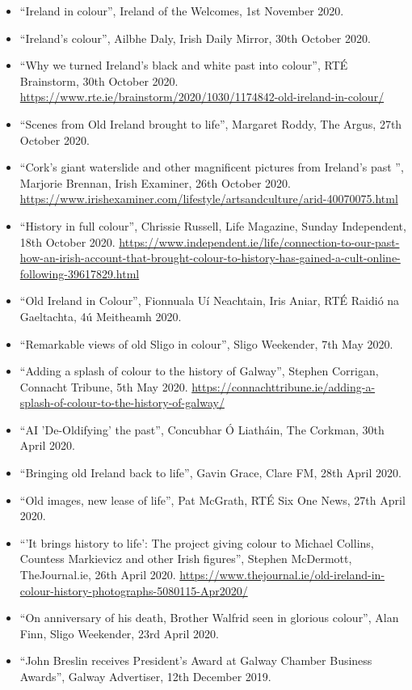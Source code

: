 \documentclass[10pt,a4paper]{res} %
\begin{document}
\begin{resume}
{\begin{itemize}
\item ``Ireland in colour'', Ireland of the Welcomes, 1st November 2020.
\item ``Ireland's colour'', Ailbhe Daly, Irish Daily Mirror, 30th October 2020.
\item ``Why we turned Ireland's black and white past into colour'', RT\'{E} Brainstorm, 30th October 2020. \url{https://www.rte.ie/brainstorm/2020/1030/1174842-old-ireland-in-colour/}
\item ``Scenes from Old Ireland brought to life'', Margaret Roddy, The Argus, 27th October 2020.
\item ``Cork's giant waterslide and other magnificent pictures from Ireland's past '', Marjorie Brennan, Irish Examiner, 26th October 2020. \url{https://www.irishexaminer.com/lifestyle/artsandculture/arid-40070075.html}
\item ``History in full colour'', Chrissie Russell, Life Magazine, Sunday Independent, 18th October 2020. \url{https://www.independent.ie/life/connection-to-our-past-how-an-irish-account-that-brought-colour-to-history-has-gained-a-cult-online-following-39617829.html}
\item ``Old Ireland in Colour'', Fionnuala U\'{i} Neachtain, Iris Aniar, RT\'{E} Raidi\'{o} na Gaeltachta, 4\'{u} Meitheamh 2020.
\item ``Remarkable views of old Sligo in colour'', Sligo Weekender, 7th May 2020.
\item ``Adding a splash of colour to the history of Galway'', Stephen Corrigan, Connacht Tribune, 5th May 2020. \url{https://connachttribune.ie/adding-a-splash-of-colour-to-the-history-of-galway/}
\item ``AI 'De-Oldifying' the past'', Concubhar \'{O} Liath\'{a}in, The Corkman, 30th April 2020.
\item ``Bringing old Ireland back to life'', Gavin Grace, Clare FM, 28th April 2020.
\item ``Old images, new lease of life'', Pat McGrath, RT\'{E} Six One News, 27th April 2020.
\item ``'It brings history to life': The project giving colour to Michael Collins, Countess Markievicz and other Irish figures'', Stephen McDermott, TheJournal.ie, 26th April 2020. \url{https://www.thejournal.ie/old-ireland-in-colour-history-photographs-5080115-Apr2020/}
\item ``On anniversary of his death, Brother Walfrid seen in glorious colour'', Alan Finn, Sligo Weekender, 23rd April 2020.
\item ``John Breslin receives President's Award at Galway Chamber Business Awards'', Galway Advertiser, 12th December 2019.

\end{itemize}}
\end{resume}
\end{document}
